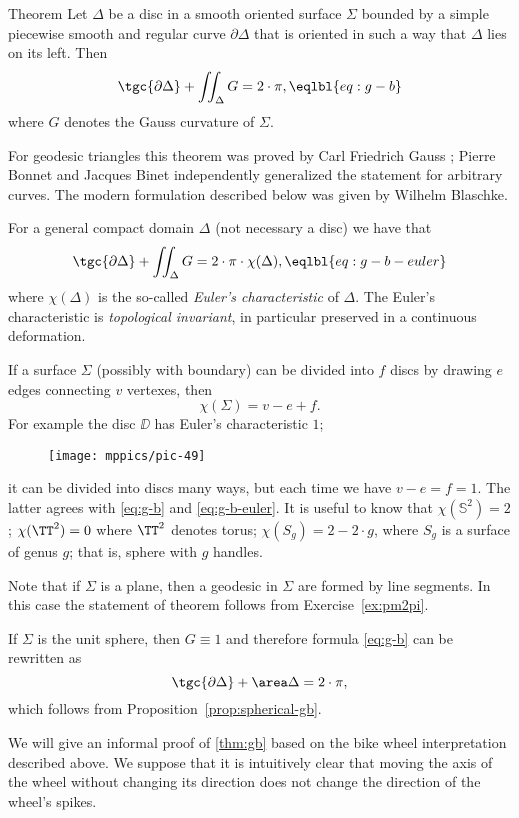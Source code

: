 \begin{thm}{Theorem}\label{thm:gb}
Let $\Delta$ be a disc in a smooth oriented surface $\Sigma$ bounded by a simple piecewise smooth and regular curve $\partial \Delta$ that is oriented in such a way that $\Delta$ lies on its left.
Then 
\[\tgc{\partial\Delta}+\iint_\Delta G=2\cdot \pi,\eqlbl{eq:g-b}\]
where $G$ denotes the Gauss curvature of $\Sigma$.
\end{thm}

For geodesic triangles this theorem was proved by Carl Friedrich Gauss \cite{gauss};
Pierre Bonnet and Jacques Binet independently generalized the statement for arbitrary curves. 
The modern formulation described below was given by Wilhelm Blaschke. 


For a general compact domain $\Delta$ (not necessary a disc) we have that
\[\tgc{\partial\Delta}+\iint_{\Delta} G=2\cdot  \pi\cdot\chi(\Delta),\eqlbl{eq:g-b-euler}\]
where $\chi(\Delta)$ is the so-called \emph{Euler's characteristic} of $\Delta$.
The Euler's characteristic is \emph{topological invariant}, in particular preserved in a continuous deformation.

If a surface $\Sigma$ (possibly with boundary) can be divided into $f$ discs by drawing $e$ edges connecting $v$ vertexes, then 
\[\chi(\Sigma)=v-e+f.\]
For example the disc $\DD$ has Euler's characteristic $1$; 
\begin{figure}[h!]
\vskip-0mm
\centering
\texttt{[image: mppics/pic-49]}
\vskip-0mm
\end{figure}
it can be divided into discs many ways, 
but each time we have $v-e=f=1$.
The latter agrees with \ref{eq:g-b} and \ref{eq:g-b-euler}.
It is useful to know that $\chi(\mathbb{S}^2)=2$; $\chi(\TT^2)=0$ where $\TT^2$ denotes torus; 
$\chi(S_g)=2-2\cdot g$, where $S_g$ is a surface of genus $g$;
that is, sphere with $g$ handles.

 Note that if $\Sigma$ is a plane, then a geodesic in $\Sigma$ are formed by line segments.
In this case the statement of theorem follows from Exercise~\ref{ex:pm2pi}.

 If $\Sigma$ is the unit sphere, then $G\equiv1$ and therefore formula \ref{eq:g-b} can be rewritten as 
\[\tgc{\partial\Delta}+\area\Delta=2\cdot \pi,\]
which follows from Proposition~\ref{prop:spherical-gb}.

\medskip

We will give an informal proof of \ref{thm:gb} based on the bike wheel interpretation described above.
We suppose that it is intuitively clear that moving the axis of the wheel without changing its direction does not change the direction of the wheel's spikes.


